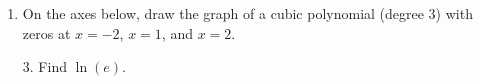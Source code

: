 \documentclass[11pt]{article}
\begin{document}
\pagestyle{empty}
\newsavebox{\quizfront}
\begin{lrbox}{\quizfront}
\begin{minipage}[top][4.5in][t]{\textwidth} \setlength{\parindent}{1.5em}
\drawtitle
\vspace{-0.5in}
\begin{enumerate}

\item On the axes below, draw the graph of a cubic polynomial (degree 3)
  with zeros at $x=-2$, $x=1$, and $x=2$.

  \vfill
  
  \begin{center}
  \end{center}
  \vfill

\end{enumerate}



\end{minipage}
\end{lrbox}

\newsavebox{\quizback}
\begin{lrbox}{\quizback}
\begin{minipage}[top][4.5in][t]{\textwidth} \setlength{\parindent}{1.5em}
\begin{itemize}
 \item[3.] Find $\ln(e)$. 


\end{itemize}
\end{minipage}
\end{lrbox}

\noindent \usebox{\quizfront}
\vfill

\end{document}
